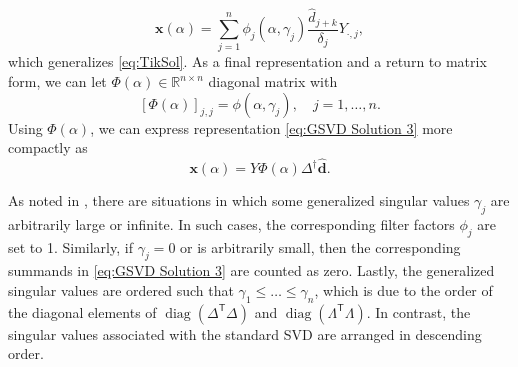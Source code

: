 \documentclass[12pt]{article}
\newcommand{\dVec}{\mathbf{d}}	%
\newcommand{\xVec}{\mathbf{x}}	%
\newcommand{\trans}[1]{{#1}^\mathsf{T}}	%
\newcommand{\pinv}[1]{{#1}^\dagger}	%
\DeclareMathOperator{\diag}{diag}	%
\newcommand{\regparam}{\alpha}  %
\newcommand{\filt}{\phi}
\newcommand{\svd}[1]{\widehat{#1}}	%
\begin{document}
\begin{equation}
\label{eq:GSVD Solution 3}
\xVec(\regparam) = \sum_{j = 1}^{n} \filt_j\left(\regparam,\gamma_j\right) \frac{\svd{d}_{j+k}}{\delta_j} Y_{\cdot,j},
\end{equation}
which generalizes \eqref{eq:TikSol}. As a final representation and a return to matrix form, we can let $\Phi(\regparam) \in \mathbb{R}^{n \times n}$ diagonal matrix with
\[\left[\Phi(\regparam)\right]_{j,j} = \filt\left(\regparam,\gamma_j\right), \quad j = 1,\ldots,n.\]
Using $\Phi(\regparam)$, we can express representation \eqref{eq:GSVD Solution 3} more compactly as
\[\xVec(\regparam) = Y\Phi(\regparam)\pinv{\Delta}\svd{\dVec}.\]

As noted in \cite{ABT}, there are situations in which some generalized singular values $\gamma_j$ are arbitrarily large or infinite. In such cases, the corresponding filter factors $\filt_j$ are set to 1. Similarly, if $\gamma_j = 0$ or is arbitrarily small, then the corresponding summands in \eqref{eq:GSVD Solution 3} are counted as zero. Lastly, the generalized singular values are ordered such that $\gamma_1 \leq \ldots \leq \gamma_n$, which is due to the order of the diagonal elements of $\diag(\trans{\Delta}\Delta)$ and $\diag(\trans{\Lambda}\Lambda)$. In contrast, the singular values associated with the standard SVD are arranged in descending order.
\end{document}
